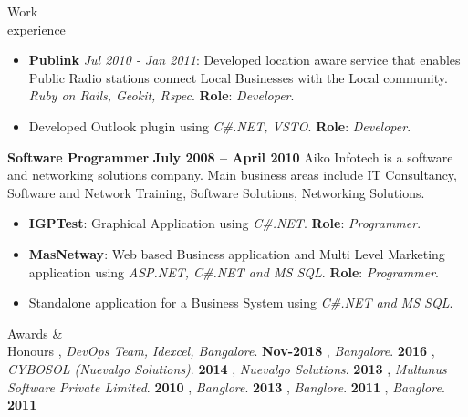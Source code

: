 \documentclass{resume}
\begin{document}
\begin{category}{Work \\experience}
\begin{itemize}
{      RSpec2}. \textbf{Role}: {\em Developer}.
  \item \textbf{Publink} {\em Jul 2010 - Jan 2011}: Developed location aware service that enables Public Radio
    stations connect Local Businesses with the Local community. {\em Ruby on Rails, Geokit, Rspec}. \textbf{Role}: {\em Developer}.
  \item Developed Outlook plugin using {\em C\#.NET, VSTO}. \textbf{Role}: {\em Developer}.
  \end{itemize}
  \citemnobullet \textbf{Software Programmer} \hfill \textbf{July 2008 -- April 2010}
  \citemnobullet Aiko Infotech is a software and networking solutions
  company. Main business areas include IT Consultancy, Software and Network
  Training, Software Solutions, Networking Solutions.
  \begin{itemize}
  \item \textbf{IGPTest}: Graphical Application using {\em C\#.NET}. \textbf{Role}: {\em Programmer}.
  \item \textbf{MasNetway}: Web based Business application and Multi Level Marketing
    application using {\em ASP.NET, C\#.NET and MS SQL}. \textbf{Role}: {\em Programmer}.
  \item Standalone application for a Business System using {\em C\#.NET and MS SQL}.
  \end{itemize}
\end{category}


\begin{category}{Awards \&\\ Honours}
  , {\em
    DevOps Team, Idexcel, Bangalore}. \hfill \textbf{Nov-2018}
  , {\em
    Bangalore}. \hfill \textbf{2016}
  , {\em
    CYBOSOL (Nuevalgo Solutions)}. \hfill \textbf{2014}
  , {\em Nuevalgo Solutions}. \hfill \textbf{2013}
  , {\em Multunus Software Private Limited}. \hfill \textbf{2010}
  , {\em Banglore}. \hfill \textbf{2013}
  , {\em Banglore}. \hfill \textbf{2011}
  , {\em Banglore}. \hfill \textbf{2011}
\end{category}


\end{document}
